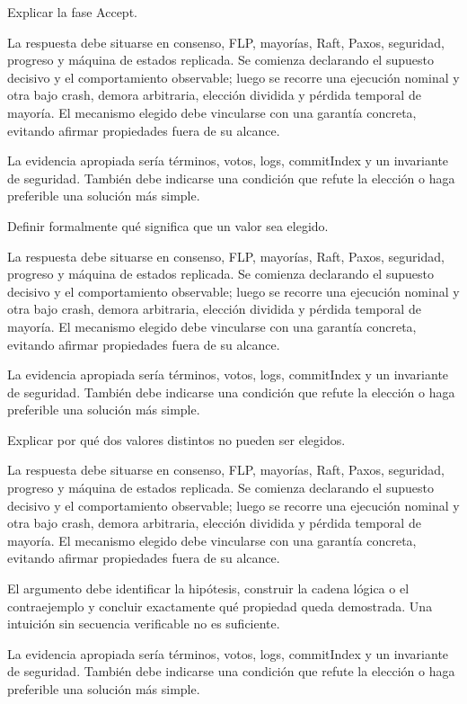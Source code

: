 \documentclass[variant=guia,cover=institutional,mode=screen]{ua-engineering-v6-article}
\begin{document}
\begin{uaexercise}
Explicar la fase Accept.
\end{uaexercise}
\begin{uaanswer}
La respuesta debe situarse en consenso, FLP, mayorías, Raft, Paxos, seguridad, progreso y máquina de estados replicada. Se comienza declarando el supuesto decisivo y el comportamiento observable; luego se recorre una ejecución nominal y otra bajo crash, demora arbitraria, elección dividida y pérdida temporal de mayoría. El mecanismo elegido debe vincularse con una garantía concreta, evitando afirmar propiedades fuera de su alcance.

La evidencia apropiada sería términos, votos, logs, commitIndex y un invariante de seguridad. También debe indicarse una condición que refute la elección o haga preferible una solución más simple.
\end{uaanswer}

\begin{uaexercise}
Definir formalmente qué significa que un valor sea elegido.
\end{uaexercise}
\begin{uaanswer}
La respuesta debe situarse en consenso, FLP, mayorías, Raft, Paxos, seguridad, progreso y máquina de estados replicada. Se comienza declarando el supuesto decisivo y el comportamiento observable; luego se recorre una ejecución nominal y otra bajo crash, demora arbitraria, elección dividida y pérdida temporal de mayoría. El mecanismo elegido debe vincularse con una garantía concreta, evitando afirmar propiedades fuera de su alcance.

La evidencia apropiada sería términos, votos, logs, commitIndex y un invariante de seguridad. También debe indicarse una condición que refute la elección o haga preferible una solución más simple.
\end{uaanswer}

\begin{uaexercise}
Explicar por qué dos valores distintos no pueden ser elegidos.
\end{uaexercise}
\begin{uaanswer}
La respuesta debe situarse en consenso, FLP, mayorías, Raft, Paxos, seguridad, progreso y máquina de estados replicada. Se comienza declarando el supuesto decisivo y el comportamiento observable; luego se recorre una ejecución nominal y otra bajo crash, demora arbitraria, elección dividida y pérdida temporal de mayoría. El mecanismo elegido debe vincularse con una garantía concreta, evitando afirmar propiedades fuera de su alcance.

El argumento debe identificar la hipótesis, construir la cadena lógica o el contraejemplo y concluir exactamente qué propiedad queda demostrada. Una intuición sin secuencia verificable no es suficiente.

La evidencia apropiada sería términos, votos, logs, commitIndex y un invariante de seguridad. También debe indicarse una condición que refute la elección o haga preferible una solución más simple.
\end{uaanswer}
\end{document}
